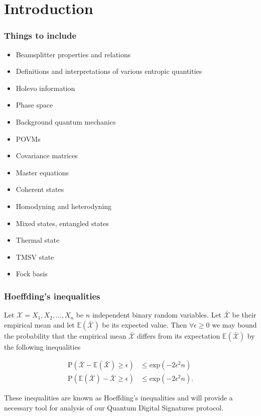 \chapter{Introduction}

\subsection{Things to include}
\begin{itemize}
\item Beamsplitter properties and relations
\item Definitions and interpretations of various entropic quantities
\item Holevo information
\item Phase space
\item Background quantum mechanics
\item POVMs
\item Covariance matrices
\item Master equations
\item Coherent states
\item Homodyning and heterodyning
\item Mixed states, entangled states
\item Thermal state
\item TMSV state
\item Fock basis
\end{itemize}

\subsection{Hoeffding's inequalities}
Let $\mathcal{X} = X_1, X_2, \dots, X_n$ be $n$ independent binary random variables. Let $\bar{\mathcal{X}}$ be their empirical mean  and let $\mathbb{E}\left(\bar{\mathcal{X}}\right)$ be its expected value. Then $\forall \epsilon \ge 0$ we may bound the probability that the empirical mean $\bar{\mathcal{X}}$ differs from its expectation $\mathbb{E}\left(\bar{\mathcal{X}}\right)$ by the following inequalities

\begin{align}
\label{eqn:hoeffding1}
\text{P}\left(\bar{\mathcal{X}} - \mathbb{E}\left(\bar{\mathcal{X}}\right) \ge \epsilon\right) &\le \text{exp}\left(- 2 \epsilon^2 n\right) \\
\label{eqn:hoeffding2}
\text{P}\left(\mathbb{E}\left(\bar{\mathcal{X}}\right) - \bar{\mathcal{X}} \ge \epsilon\right) &\le \text{exp}\left(- 2 \epsilon^2 n\right).
\end{align}

\noindent These inequalities are known as Hoeffding's inequalities  and will provide a necessary tool for analysis of our Quantum Digital Signatures protocol.

